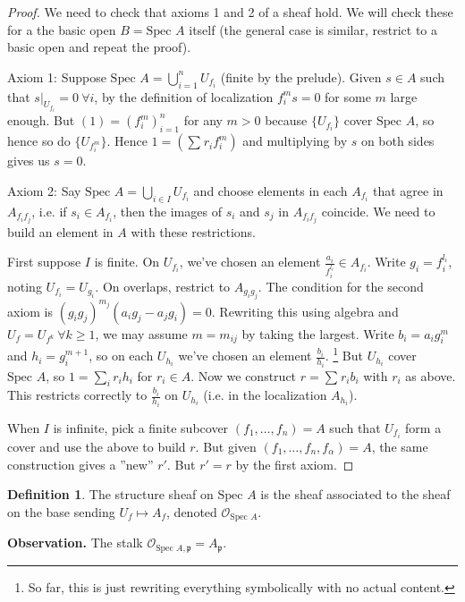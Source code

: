 \documentclass{article}
\theoremstyle{definition}
\newtheorem{defn}{Definition}[section]
\begin{document}
\begin{proof}
    We need to check that axioms 1 and 2 of a sheaf hold. We will check these for a the basic open $B = \text{Spec }A$ itself (the general case is similar, restrict to a basic open and repeat the proof).
    \vspace{1mm}
     
    Axiom 1: Suppose $\text{Spec }A = \bigcup_{i=1}^n U_{f_i}$ (finite by the prelude). Given $s \in A$ such that $s|_{U_{f_i}} = 0 ~\forall i$, by the definition of localization $f_i^m s = 0$ for some $m$ large enough. But $(1) = (f_i^m)_{i=1}^n$ for any $m>0$ because $\{U_{f_i}\}$ cover $\text{Spec }A$, so hence so do $\{U_{f_i^m}\}$. Hence $1 = \left(\sum_{}^{} r_i f_i^m \right)$ and multiplying by $s$ on both sides gives us $s = 0$.
    \vspace{1mm}
     
    Axiom 2: Say $\text{Spec }A = \bigcup_{i \in I} U_{f_i}$ and choose elements in each $A_{f_i}$ that agree in $A_{f_i f_j}$, i.e. if $s_i \in A_{f_i}$, then the images of $s_i$ and $s_j$ in $A_{f_i f_j}$ coincide. We need to build an element in $A$ with these restrictions. 
    \vspace{1mm}
     
    First suppose $I$ is finite. On $U_{f_i}$, we've chosen an element $\frac{a_i}{f_i^{l_i}} \in A_{f_i}$. Write $g_i = f_i^{l_i}$, noting $U_{f_i} = U_{g_i}$. On overlaps, restrict to $A_{g_ig_j}$. The condition for the second axiom is $(g_i g_j)^{m_j}(a_i g_j - a_j g_i) = 0$. Rewriting this using algebra and $U_f = U_{f^k} ~\forall k\ge 1$, we may assume $m = m_{ij}$ by taking the largest. Write $b_i = a_i g_i^m$ and $h_i = g_i^{m+1}$, so on each $U_{h_i}$ we've chosen an element $\frac{b_i}{h_i}$. \footnote{So far, this is just rewriting everything symbolically with no actual content.} But $U_{h_i}$ cover $\text{Spec }A$, so $1 = \sum_{i}^{} r_i h_i$ for $r_i \in A$. Now we construct $r = \sum_{}^{} r_i b_i$ with $r_i$ as above. This restricts correctly to $\frac{b_i}{h_i}$ on $U_{h_i}$ (i.e. in the localization $A_{h_i}$).
    \vspace{1mm}
     
    When $I$ is infinite, pick a finite subcover $(f_1,\ldots,f_n) = A$ such that $U_{f_i}$ form a cover and use the above to build $r$. But given $(f_1,\ldots,f_n, f_{\alpha}) = A$, the same construction gives a ''new'' $r'$. But $r' = r$ by the first axiom. 
\end{proof}
\begin{defn}
    The structure sheaf on $\text{Spec }A$ is the sheaf associated to the sheaf on the base sending $U_f \mapsto A_f$, denoted $\mathcal{O}_{\text{Spec }A}$.
\end{defn}
\textbf{Observation.} The stalk $\mathcal{O}_{\text{Spec }A, \mathfrak{p}} = A_{\mathfrak{p}}$.
\vspace{1mm}
 
\end{document}
